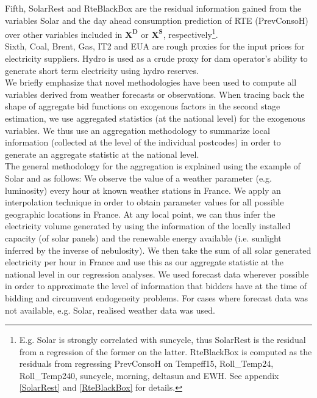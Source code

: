 Fifth, SolarRest and RteBlackBox are the residual information gained from the variables Solar and the day ahead consumption prediction of RTE (PrevConsoH) over other variables included in $\boldsymbol{X^D}$ or $\boldsymbol{X^S}$, respectively\footnote{E.g. Solar is strongly correlated with suncycle, thus SolarRest is the residual from a regression of the former on the latter. RteBlackBox is computed as the residuals from regressing PrevConsoH on Tempeff15,  Roll\_Temp24,  Roll\_Temp240, suncycle, morning, deltasun and EWH. See appendix \ref{SolarRest} and \ref{RteBlackBox} for details.}.  \\
Sixth, Coal, Brent, Gas, IT2 and EUA are rough proxies for the input prices for electricity suppliers. Hydro is used as a crude proxy for dam operator's ability to generate short term electricity using hydro reserves. \\

We briefly emphasize that novel methodologies have been used to compute all variables derived from weather forecasts or observations. 
When tracing back the shape of aggregate bid functions on exogenous factors in the second stage estimation, we use aggregated statistics (at the national level) for the exogenous variables. We thus use an aggregation methodology to summarize local information (collected at the level of the individual postcodes) in order to generate an aggregate statistic at the national level. \\

The general methodology for the aggregation is explained using the example of Solar and as follows: We observe the value of a weather parameter (e.g. luminosity) every hour at known weather stations in France. 
We apply an interpolation technique in order to obtain parameter values for all possible geographic locations in France. At any local point, we can thus infer the electricity volume generated by using the information of the locally installed capacity (of solar panels) and the renewable energy available (i.e. sunlight inferred by the inverse of nebulosity). We then take the sum of all solar generated electricity per hour in France and use this as our aggregate statistic at the national level in our regression analyses. 
We used forecast data wherever possible in order to approximate the level of information that bidders have at the time of bidding and circumvent endogeneity problems. 
For cases where forecast data was not available, e.g. Solar, realised weather data was used. 


